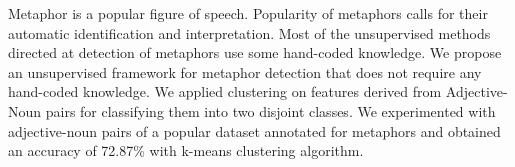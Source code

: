 Metaphor is a popular figure of speech. Popularity of metaphors calls for their automatic identification and interpretation. Most of the unsupervised methods directed at detection of metaphors use some hand-coded knowledge. We propose an unsupervised framework for metaphor detection that does not require any hand-coded knowledge. We applied clustering on features derived from Adjective-Noun pairs for classifying them into two disjoint classes. We experimented with adjective-noun pairs of a popular dataset annotated for metaphors and obtained an accuracy of 72.87\% with k-means clustering algorithm.
